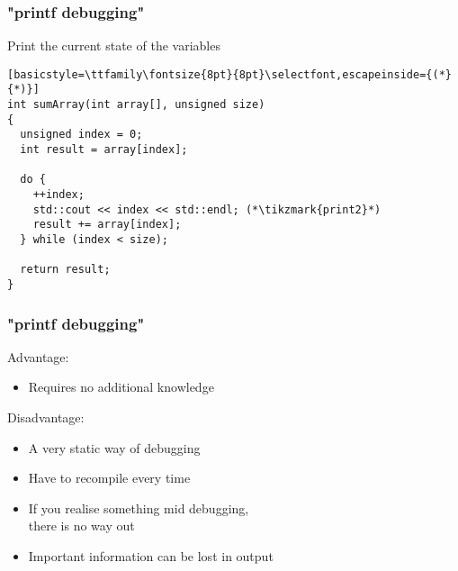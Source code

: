 \documentclass[14pt,a4paper,dvipsnames,usenames]{beamer}
\begin{document}
\begin{frame}[fragile]
  \frametitle{"printf debugging"}

  Print the current state of the variables

  \hspace{1em}
  \begin{lstlisting}[basicstyle=\ttfamily\fontsize{8pt}{8pt}\selectfont,escapeinside={(*}{*)}]
int sumArray(int array[], unsigned size)
{
  unsigned index = 0;
  int result = array[index];

  do {
    ++index;
    std::cout << index << std::endl; (*\tikzmark{print2}*)
    result += array[index];
  } while (index < size);

  return result;
}
  \end{lstlisting}

  \nointerlineskip
  
\end{frame}

\begin{frame}[fragile]
  \frametitle{"printf debugging"}

  {\color{FeebleWeek}\large Advantage:}
  \begin{itemize}
    \item Requires no additional knowledge
  \end{itemize}

  \vspace{1em}
  {\color{Marty}\large{}Disadvantage:}
  { 
  \begin{itemize}
    \item A very static way of debugging
    \item Have to recompile every time
    \item If you realise something mid debugging,\\there is no way out
    \item Important information can be lost in output
  \end{itemize}
  }

\end{frame}
\end{document}
